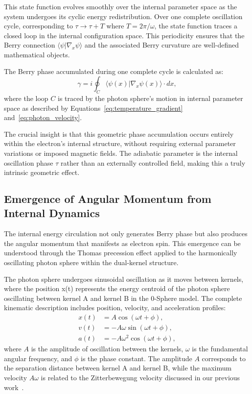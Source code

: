 \documentclass[%
 reprint,
 amsmath,amssymb,
 aps,
]{revtex4-1}
\numberwithin{equation}{section}%
\begin{document}
This state function evolves smoothly over the internal parameter space as the system undergoes its cyclic energy redistribution. Over one complete oscillation cycle, corresponding to $\tau \rightarrow \tau + T$ where $T = 2\pi/\omega$, the state function traces a closed loop in the internal configuration space. This periodicity ensures that the Berry connection $\langle \psi | \nabla_x \psi \rangle$ and the associated Berry curvature are well-defined mathematical objects.

The Berry phase accumulated during one complete cycle is calculated as:
\begin{equation}
\gamma = i \oint_C \langle \psi(x) | \nabla_x \psi(x) \rangle \cdot dx, \label{eq:berry_phase_integral}
\end{equation}
where the loop $C$ is traced by the photon sphere's motion in internal parameter space as described by Equations~\eqref{eq:temperature_gradient} and~\eqref{eq:photon_velocity}.

The crucial insight is that this geometric phase accumulation occurs entirely within the electron's internal structure, without requiring external parameter variations or imposed magnetic fields. The adiabatic parameter is the internal oscillation phase $\tau$ rather than an externally controlled field, making this a truly intrinsic geometric effect.

\subsection{Emergence of Angular Momentum from Internal Dynamics} \label{subsec:angular_momentum}

The internal energy circulation not only generates Berry phase but also produces the angular momentum that manifests as electron spin. This emergence can be understood through the Thomas precession effect applied to the harmonically oscillating photon sphere within the dual-kernel structure.

The photon sphere undergoes sinusoidal oscillation as it moves between kernels, where the position x(t) represents the energy centroid of the photon sphere oscillating between kernel A and kernel B in the 0-Sphere model. The complete kinematic description includes position, velocity, and acceleration profiles:
\begin{align}
x(t) &= A \cos(\omega t + \phi), \label{eq:position_profile}\\
v(t) &= -A\omega \sin(\omega t + \phi), \label{eq:velocity_profile}\\
a(t) &= -A\omega^2 \cos(\omega t + \phi), \label{eq:acceleration_profile}
\end{align}
where $A$ is the amplitude of oscillation between the kernels, $\omega$ is the fundamental angular frequency, and $\phi$ is the phase constant. The amplitude $A$ corresponds to the separation distance between kernel A and kernel B, while the maximum velocity $A\omega$ is related to the Zitterbewegung velocity discussed in our previous work~\cite{hanamura2501.0130}.
\end{document}

